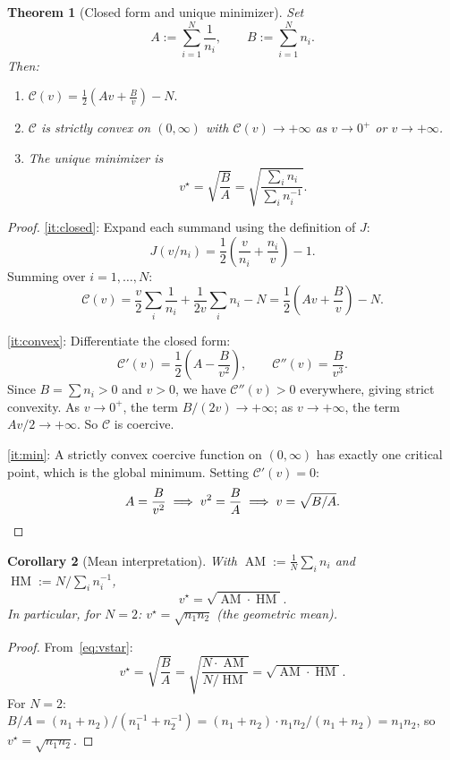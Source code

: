 \documentclass[11pt]{amsart}
\newtheorem{theorem}{Theorem}[section]
\newtheorem{corollary}[theorem]{Corollary}
\theoremstyle{definition}
\theoremstyle{remark}
\begin{document}
\begin{theorem}[Closed form and unique minimizer]\label{thm:minimizer}
Set
\[
A:=\sum_{i=1}^N\frac1{n_i},\qquad
B:=\sum_{i=1}^N n_i.
\]
Then:
\begin{enumerate}[label=\textup{(\roman*)},nosep]
\item\label{it:closed}
$\displaystyle\mathcal C(v)=\frac12\!\left(Av+\frac{B}{v}\right)-N.$
\item\label{it:convex}
$\mathcal C$ is strictly convex on $(0,\infty)$ with
$\mathcal C(v)\to+\infty$ as $v\to 0^+$ or $v\to+\infty$.
\item\label{it:min}
The unique minimizer is
\begin{equation}\label{eq:vstar}
v^\star=\sqrt{\frac{B}{A}}
=\sqrt{\frac{\sum_i n_i}{\sum_i n_i^{-1}}}.
\end{equation}
\end{enumerate}
\end{theorem}
\begin{proof}
\ref{it:closed}: Expand each summand using the definition of $J$:
\[
J(v/n_i)=\frac12\!\left(\frac{v}{n_i}+\frac{n_i}{v}\right)-1.
\]
Summing over $i=1,\dots,N$:
\[
\mathcal C(v)
=\frac{v}{2}\sum_i\frac{1}{n_i}+\frac{1}{2v}\sum_i n_i-N
=\frac12\!\left(Av+\frac{B}{v}\right)-N.
\]

\ref{it:convex}: Differentiate the closed form:
\[
\mathcal C'(v)=\frac12\!\left(A-\frac{B}{v^2}\right),\qquad
\mathcal C''(v)=\frac{B}{v^3}.
\]
Since $B=\sum n_i>0$ and $v>0$, we have $\mathcal C''(v)>0$ everywhere,
giving strict convexity.  As $v\to0^+$, the term $B/(2v)\to+\infty$;
as $v\to+\infty$, the term $Av/2\to+\infty$.  So $\mathcal C$ is coercive.

\ref{it:min}: A strictly convex coercive function on $(0,\infty)$ has
exactly one critical point, which is the global minimum.
Setting $\mathcal C'(v)=0$:
\[
A=\frac{B}{v^2}\implies v^2=\frac{B}{A}\implies v=\sqrt{B/A}.
\qedhere
\]
\end{proof}

\begin{corollary}[Mean interpretation]\label{cor:means}
With $\operatorname{AM}:=\frac1N\sum_i n_i$ and
$\operatorname{HM}:=N/\!\sum_i n_i^{-1}$,
\[
v^\star=\sqrt{\operatorname{AM}\cdot\operatorname{HM}}.
\]
In particular, for $N=2$: $v^\star=\sqrt{n_1n_2}$ (the geometric mean).
\end{corollary}
\begin{proof}
From~\eqref{eq:vstar}:
\[
v^\star=\sqrt{\frac{B}{A}}
=\sqrt{\frac{N\cdot\operatorname{AM}}{N/\operatorname{HM}}}
=\sqrt{\operatorname{AM}\cdot\operatorname{HM}}.
\]
For $N=2$: $B/A=(n_1+n_2)/(n_1^{-1}+n_2^{-1})
=(n_1+n_2)\cdot n_1n_2/(n_1+n_2)=n_1n_2$, so $v^\star=\sqrt{n_1n_2}$.
\end{proof}
\end{document}
